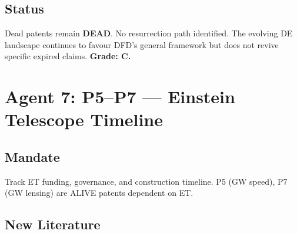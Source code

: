\documentclass[11pt,a4paper]{article}
\begin{document}
\subsection{Status}
Dead patents remain \textbf{DEAD}. No resurrection path identified. The evolving DE landscape continues to favour DFD's general framework but does not revive specific expired claims. \textbf{Grade: C.}

\section{Agent 7: P5--P7 --- Einstein Telescope Timeline}

\subsection{Mandate}
Track ET funding, governance, and construction timeline. P5 (GW speed), P7 (GW lensing) are ALIVE patents dependent on ET.

\subsection{New Literature}
\end{document}
